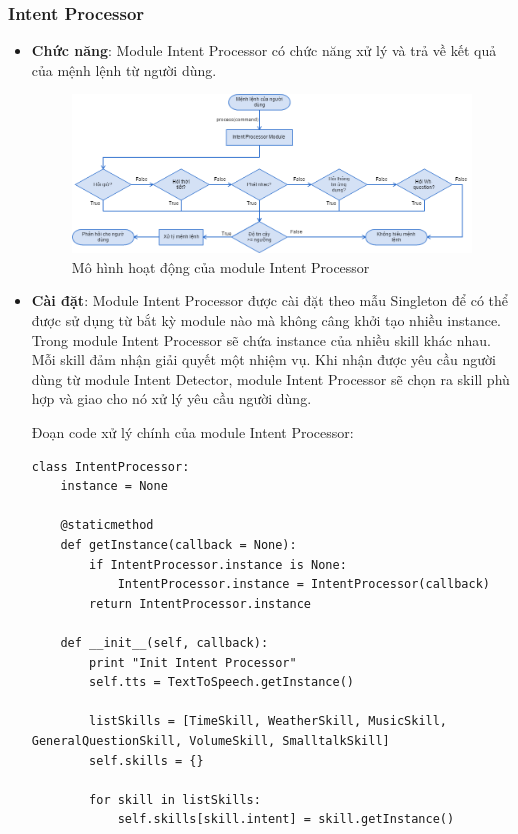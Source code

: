 \subsubsection{Intent Processor}
\begin{itemize}
\item \textbf{Chức năng}: Module Intent Processor có chức năng xử lý và trả về kết quả của mệnh lệnh từ người dùng.

\begin{figure}[h]
    \centering
    \includegraphics[scale=0.5]{intent_processor_flowchart}
    \caption{Mô hình hoạt động của module Intent Processor}
    \label{fig:c6_intent_processor_flowchart}
\end{figure}

\item \textbf{Cài đặt}: Module Intent Processor được cài đặt theo mẫu Singleton để có thể được sử dụng từ bắt kỳ module nào mà không câng khởi tạo nhiều instance. Trong module Intent Processor sẽ chứa instance của nhiều skill khác nhau. Mỗi skill đảm nhận giải quyết một nhiệm vụ. Khi nhận được yêu cầu người dùng từ module Intent Detector, module Intent Processor sẽ chọn ra skill phù hợp và giao cho nó xử lý yêu cầu người dùng.

Đoạn code xử lý chính của module Intent Processor:
\begin{lstlisting}
class IntentProcessor:
    instance = None

    @staticmethod
    def getInstance(callback = None):
        if IntentProcessor.instance is None:
            IntentProcessor.instance = IntentProcessor(callback)
        return IntentProcessor.instance

    def __init__(self, callback):
        print "Init Intent Processor"
        self.tts = TextToSpeech.getInstance()

        listSkills = [TimeSkill, WeatherSkill, MusicSkill, GeneralQuestionSkill, VolumeSkill, SmalltalkSkill]
        self.skills = {}

        for skill in listSkills:
            self.skills[skill.intent] = skill.getInstance()
        

\end{lstlisting}
\end{itemize}
